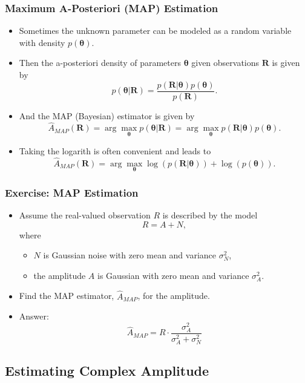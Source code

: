 \begin{frame}
  \frametitle{Maximum A-Posteriori (MAP) Estimation}
  \begin{itemize}
  \item Sometimes the unknown parameter can be modeled as a random
    variable with density $p(\bm{\theta})$.
  \item Then the a-posteriori density of parameters $\bm{\theta}$
    given observations $\bm{R}$ is given by
    \[
      p(\bm{\theta} | \bm{R}) = \frac{p(\bm{R} | \bm{\theta})p(\bm{\theta})}{p(\bm{R})}.
    \]
  \item And the MAP (Bayesian) estimator is given by
    \[
      \hat{A}_{MAP}(\bm{R}) = \arg \max_{\bm{\theta}} p(\bm{\theta} | \bm{R})
      = \arg \max_{\bm{\theta}} p(\bm{R} | \bm{\theta})p(\bm{\theta}).
    \]
  \item Taking the logarith is often convenient and leads to
    \[
      \hat{A}_{MAP}(\bm{R}) = \arg \max_{\bm{\theta}} \log(p(\bm{R} | \bm{\theta}))
      + \log(p(\bm{\theta})).
    \]
  \end{itemize}
\end{frame}

\begin{frame}
  \frametitle{Exercise: MAP Estimation}
  \begin{itemize}
  \item Assume the real-valued observation $R$ is described by the model
    \[
      R = A + N,
    \]
    where
    \begin{itemize}
    \item $N$ is Gaussian noise with zero mean and variance
      $\sigma_N^2$,
    \item the amplitude $A$ is Gaussian with zero mean and variance $\sigma_A^2$.
    \end{itemize}
  \item Find the MAP estimator, $\hat{A}_{MAP}$, for the amplitude.
  \item <2-> Answer:
    \[
      \hat{A}_{MAP} = R \cdot \frac{\sigma_A^2}{\sigma_A^2 + \sigma_N^2}
    \]
  \end{itemize}
\end{frame}

\subsection{Estimating Complex Amplitude}

